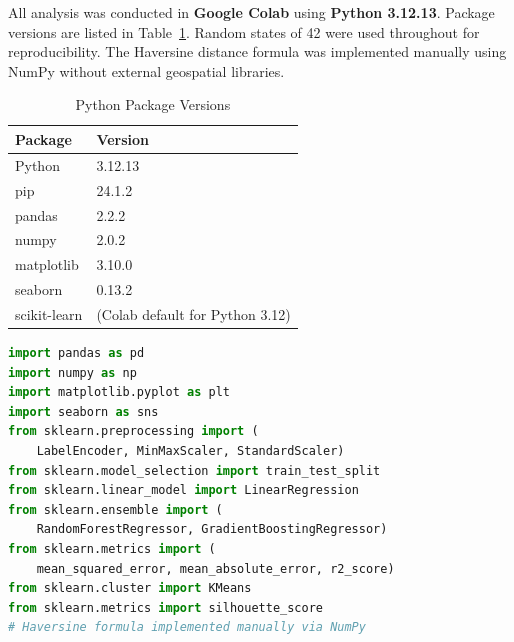 \documentclass[12pt, a4paper]{article}
\begin{document}
All analysis was conducted in \textbf{Google Colab} using
\textbf{Python 3.12.13}. Package versions are listed in
Table~\ref{tab:packages}. Random states of 42 were used
throughout for reproducibility. The Haversine distance
formula was implemented manually using NumPy without
external geospatial libraries.

\begin{table}[H]
\centering
\caption{Python Package Versions}
\label{tab:packages}
\renewcommand{\arraystretch}{1.15}
\begin{tabular}{ll}
\toprule
\textbf{Package} & \textbf{Version} \\
\midrule
Python        & 3.12.13 \\
pip           & 24.1.2 \\
pandas        & 2.2.2 \\
numpy         & 2.0.2 \\
matplotlib    & 3.10.0 \\
seaborn       & 0.13.2 \\
scikit-learn  & (Colab default for Python 3.12) \\
\bottomrule
\end{tabular}
\end{table}

\begin{lstlisting}[language=Python,
                   caption={Key Libraries Used}]
import pandas as pd
import numpy as np
import matplotlib.pyplot as plt
import seaborn as sns
from sklearn.preprocessing import (
    LabelEncoder, MinMaxScaler, StandardScaler)
from sklearn.model_selection import train_test_split
from sklearn.linear_model import LinearRegression
from sklearn.ensemble import (
    RandomForestRegressor, GradientBoostingRegressor)
from sklearn.metrics import (
    mean_squared_error, mean_absolute_error, r2_score)
from sklearn.cluster import KMeans
from sklearn.metrics import silhouette_score
# Haversine formula implemented manually via NumPy
\end{lstlisting}

\end{document}
